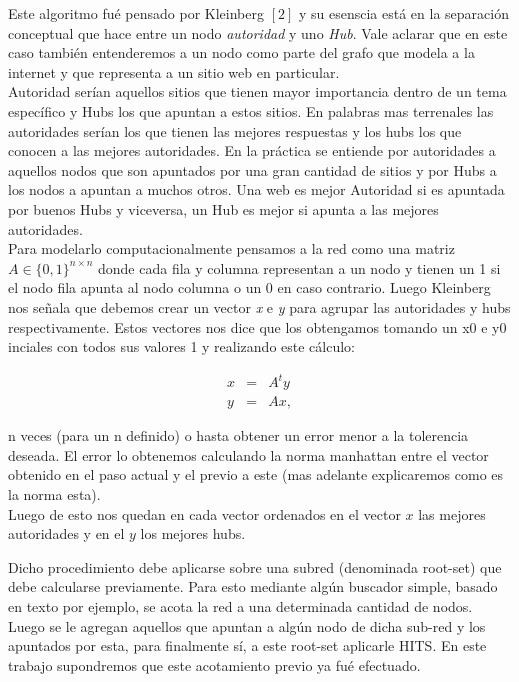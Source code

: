 Este algoritmo fué pensado por Kleinberg $[2]$ y su esenscia está en la separación conceptual que hace entre un nodo \textit{autoridad} y uno \textit{Hub}. Vale aclarar que en este caso también entenderemos a un nodo como parte del grafo que modela a la internet y que representa a un sitio web en particular. \\
Autoridad serían aquellos sitios que tienen mayor importancia dentro de un tema específico y Hubs los que apuntan a estos sitios. En palabras mas terrenales las autoridades serían los que tienen las mejores respuestas y los hubs los que conocen a las mejores autoridades.
En la práctica se entiende por autoridades a aquellos nodos que son apuntados por una gran cantidad de sitios y por Hubs a los nodos a apuntan a muchos otros. Una web es mejor Autoridad si es apuntada por buenos Hubs y viceversa, un Hub es mejor si apunta a las mejores autoridades.\\
Para modelarlo computacionalmente pensamos a la red como una matriz $A \in \{0,1\}^{n \times n}$ donde cada fila y columna representan a un nodo y tienen un 1 si el nodo fila apunta al nodo columna o un 0 en caso contrario. Luego Kleinberg nos señala que debemos crear un vector \textit{x} e \textit{y} para agrupar las autoridades y hubs respectivamente. Estos vectores nos dice que los obtengamos tomando un x0 e y0 inciales con todos sus valores 1 y realizando este cálculo:

\begin{eqnarray}
x & = & A^ty \label{eq:auth-update-math} \\
y & = & Ax, \label{eq:hub-update-math} 
\end{eqnarray}

n veces (para un n definido) o hasta obtener un error menor a la tolerencia deseada. El error lo obtenemos calculando la norma manhattan entre el vector obtenido en el paso actual y el previo a este (mas adelante explicaremos como es la norma esta).\\
Luego de esto nos quedan en cada vector ordenados en el vector $x$ las mejores autoridades y en el $y$ los mejores hubs.

Dicho procedimiento debe aplicarse sobre una subred (denominada root-set) que debe calcularse previamente. Para esto mediante algún buscador simple, basado en texto por ejemplo, se acota la red a una determinada cantidad de nodos. Luego se le agregan aquellos que apuntan a algún nodo de dicha sub-red y los apuntados por esta, para finalmente sí, a este root-set aplicarle HITS. En este trabajo supondremos que este acotamiento previo ya fué efectuado.


